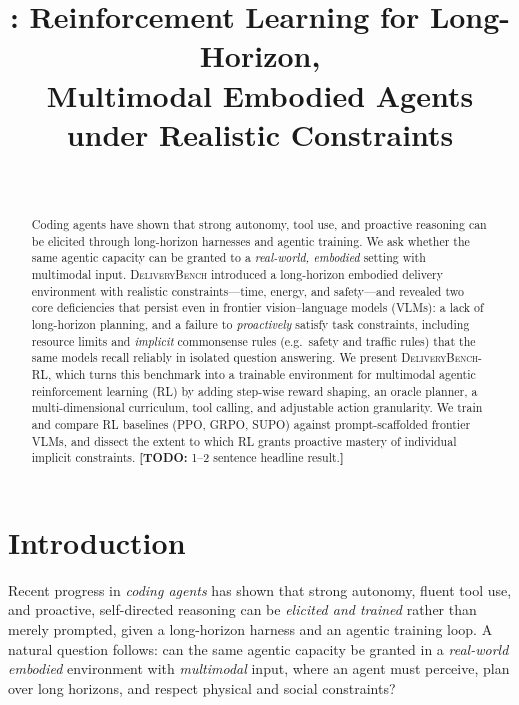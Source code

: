 \documentclass[11pt]{article}
\title{\ours: Reinforcement Learning for Long-Horizon,\\
       Multimodal Embodied Agents under Realistic Constraints}
\author{\TODO{author list} \\ \TODO{affiliation}}
\date{}
\newcommand{\ours}{\textsc{DeliveryBench-RL}\xspace}
\newcommand{\dbone}{\textsc{DeliveryBench}\xspace}
\newcommand{\TODO}[1]{{\color{red}\textbf{[TODO:} #1\textbf{]}}}
\begin{document}
\maketitle

\begin{abstract}
Coding agents have shown that strong autonomy, tool use, and proactive
reasoning can be elicited through long-horizon harnesses and agentic training.
We ask whether the same agentic capacity can be granted to a \emph{real-world,
embodied} setting with multimodal input. \dbone introduced a long-horizon
embodied delivery environment with realistic constraints---time, energy, and
safety---and revealed two core deficiencies that persist even in frontier
vision--language models (VLMs): a lack of long-horizon planning, and a failure
to \emph{proactively} satisfy task constraints, including resource limits and
\emph{implicit} commonsense rules (e.g.\ safety and traffic rules) that the
same models recall reliably in isolated question answering.
We present \ours, which turns this benchmark into a trainable environment for
multimodal agentic reinforcement learning (RL) by adding step-wise reward
shaping, an oracle planner, a multi-dimensional curriculum, tool calling, and
adjustable action granularity. We train and compare RL baselines
(PPO, GRPO, SUPO) against prompt-scaffolded frontier VLMs, and dissect the
extent to which RL grants proactive mastery of individual implicit constraints.
\TODO{1--2 sentence headline result.}
\end{abstract}

\section{Introduction}
\label{sec:intro}

Recent progress in \emph{coding agents} has shown that strong autonomy, fluent
tool use, and proactive, self-directed reasoning can be \emph{elicited and
trained} rather than merely prompted, given a long-horizon harness and an
agentic training loop. A natural question follows: can the same agentic
capacity be granted in a \emph{real-world embodied} environment with
\emph{multimodal} input, where an agent must perceive, plan over long horizons,
and respect physical and social constraints?
\end{document}
